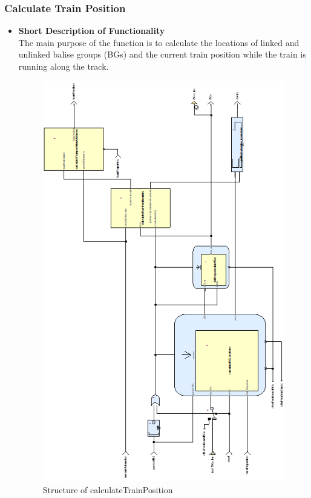 \subsubsection{Calculate Train Position}

\begin{itemize}
\item \textbf{Short Description of Functionality}\\
The main purpose of the function is to calculate the locations of linked and unlinked balise groups (BGs) and the current train position while the train is running along the track. 

\begin{figure}[hbtp]
\centering
\includegraphics[scale=1]{../images/CalculateTrainPosition.png}
\caption{Structure of calculateTrainPosition}
\end{figure}



\end{itemize}
